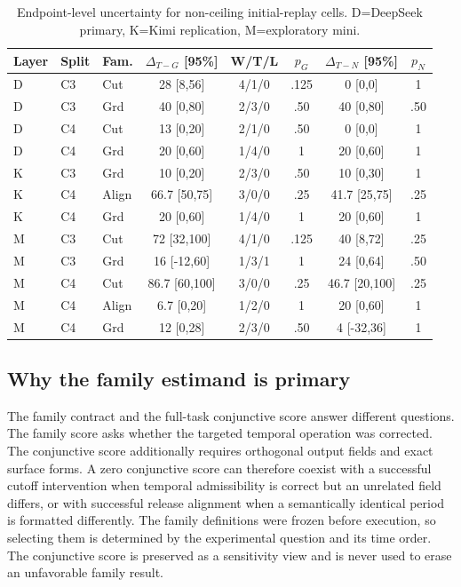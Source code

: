 \begin{table}[ht]
\centering
\scriptsize
\renewcommand{\arraystretch}{0.88}
\setlength{\tabcolsep}{2.0pt}
\begin{tabular}{lllccccc}
\toprule
Layer & Split & Fam. & $\Delta_{T-G}$ [95\%] & W/T/L & $p_G$ & $\Delta_{T-N}$ [95\%] & $p_N$ \\
\midrule
D & C3 & Cut & 28 [8,56] & 4/1/0 & .125 & 0 [0,0] & 1 \\
D & C3 & Grd & 40 [0,80] & 2/3/0 & .50 & 40 [0,80] & .50 \\
D & C4 & Cut & 13 [0,20] & 2/1/0 & .50 & 0 [0,0] & 1 \\
D & C4 & Grd & 20 [0,60] & 1/4/0 & 1 & 20 [0,60] & 1 \\
K & C3 & Grd & 10 [0,20] & 2/3/0 & .50 & 10 [0,30] & 1 \\
K & C4 & Align & 66.7 [50,75] & 3/0/0 & .25 & 41.7 [25,75] & .25 \\
K & C4 & Grd & 20 [0,60] & 1/4/0 & 1 & 20 [0,60] & 1 \\
M & C3 & Cut & 72 [32,100] & 4/1/0 & .125 & 40 [8,72] & .25 \\
M & C3 & Grd & 16 [-12,60] & 1/3/1 & 1 & 24 [0,64] & .50 \\
M & C4 & Cut & 86.7 [60,100] & 3/0/0 & .25 & 46.7 [20,100] & .25 \\
M & C4 & Align & 6.7 [0,20] & 1/2/0 & 1 & 20 [0,60] & 1 \\
M & C4 & Grd & 12 [0,28] & 2/3/0 & .50 & 4 [-32,36] & 1 \\
\bottomrule
\end{tabular}
\caption{Endpoint-level uncertainty for non-ceiling initial-replay cells. D=DeepSeek primary, K=Kimi replication, M=exploratory mini.}
\label{tab:endpointunc}
\end{table}

\subsection{Why the family estimand is primary}
The family contract and the full-task conjunctive score answer different questions. The family score asks whether the targeted temporal operation was corrected. The conjunctive score additionally requires orthogonal output fields and exact surface forms. A zero conjunctive score can therefore coexist with a successful cutoff intervention when temporal admissibility is correct but an unrelated field differs, or with successful release alignment when a semantically identical period is formatted differently. The family definitions were frozen before execution, so selecting them is determined by the experimental question and its time order. The conjunctive score is preserved as a sensitivity view and is never used to erase an unfavorable family result.

